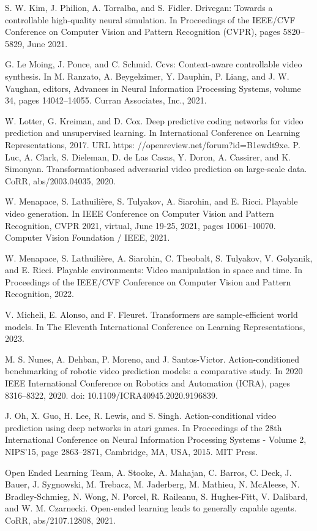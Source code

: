\documentclass[10pt]{article}
\begin{document}
S. W. Kim, J. Philion, A. Torralba, and S. Fidler. Drivegan: Towards a controllable high-quality neural simulation. In Proceedings of the IEEE/CVF Conference on Computer Vision and Pattern Recognition (CVPR), pages 5820–5829, June 2021.

G. Le Moing, J. Ponce, and C. Schmid. Ccvs: Context-aware controllable video synthesis. In M. Ranzato, A. Beygelzimer, Y. Dauphin, P. Liang, and J. W. Vaughan, editors, Advances in Neural Information Processing Systems, volume 34, pages 14042–14055. Curran Associates, Inc., 2021.

W. Lotter, G. Kreiman, and D. Cox. Deep predictive coding networks for video prediction and unsupervised learning. In International Conference on Learning Representations, 2017. URL https: //openreview.net/forum?id=B1ewdt9xe. P. Luc, A. Clark, S. Dieleman, D. de Las Casas, Y. Doron, A. Cassirer, and K. Simonyan. Transformationbased adversarial video prediction on large-scale data. CoRR, abs/2003.04035, 2020.

W. Menapace, S. Lathuilière, S. Tulyakov, A. Siarohin, and E. Ricci. Playable video generation. In IEEE Conference on Computer Vision and Pattern Recognition, CVPR 2021, virtual, June 19-25, 2021, pages 10061–10070. Computer Vision Foundation / IEEE, 2021.

W. Menapace, S. Lathuilière, A. Siarohin, C. Theobalt, S. Tulyakov, V. Golyanik, and E. Ricci. Playable environments: Video manipulation in space and time. In Proceedings of the IEEE/CVF Conference on Computer Vision and Pattern Recognition, 2022.

V. Micheli, E. Alonso, and F. Fleuret. Transformers are sample-efficient world models. In The Eleventh International Conference on Learning Representations, 2023.

M. S. Nunes, A. Dehban, P. Moreno, and J. Santos-Victor. Action-conditioned benchmarking of robotic video prediction models: a comparative study. In 2020 IEEE International Conference on Robotics and Automation (ICRA), pages 8316–8322, 2020. doi: 10.1109/ICRA40945.2020.9196839.

J. Oh, X. Guo, H. Lee, R. Lewis, and S. Singh. Action-conditional video prediction using deep networks in atari games. In Proceedings of the 28th International Conference on Neural Information Processing Systems - Volume 2, NIPS’15, page 2863–2871, Cambridge, MA, USA, 2015. MIT Press.

Open Ended Learning Team, A. Stooke, A. Mahajan, C. Barros, C. Deck, J. Bauer, J. Sygnowski, M. Trebacz, M. Jaderberg, M. Mathieu, N. McAleese, N. Bradley-Schmieg, N. Wong, N. Porcel, R. Raileanu, S. Hughes-Fitt, V. Dalibard, and W. M. Czarnecki. Open-ended learning leads to generally capable agents. CoRR, abs/2107.12808, 2021.
\end{document}
